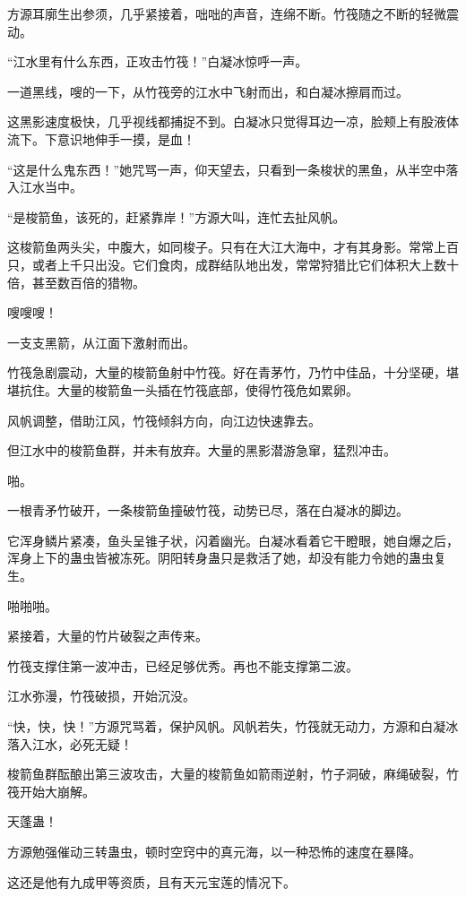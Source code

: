 \begin{this_body}
方源耳廓生出参须，几乎紧接着，咄咄的声音，连绵不断。竹筏随之不断的轻微震动。

“江水里有什么东西，正攻击竹筏！”白凝冰惊呼一声。

一道黑线，嗖的一下，从竹筏旁的江水中飞射而出，和白凝冰擦肩而过。

这黑影速度极快，几乎视线都捕捉不到。白凝冰只觉得耳边一凉，脸颊上有股液体流下。下意识地伸手一摸，是血！

“这是什么鬼东西！”她咒骂一声，仰天望去，只看到一条梭状的黑鱼，从半空中落入江水当中。

“是梭箭鱼，该死的，赶紧靠岸！”方源大叫，连忙去扯风帆。

这梭箭鱼两头尖，中腹大，如同梭子。只有在大江大海中，才有其身影。常常上百只，或者上千只出没。它们食肉，成群结队地出发，常常狩猎比它们体积大上数十倍，甚至数百倍的猎物。

嗖嗖嗖！

一支支黑箭，从江面下激射而出。

竹筏急剧震动，大量的梭箭鱼射中竹筏。好在青茅竹，乃竹中佳品，十分坚硬，堪堪抗住。大量的梭箭鱼一头插在竹筏底部，使得竹筏危如累卵。

风帆调整，借助江风，竹筏倾斜方向，向江边快速靠去。

但江水中的梭箭鱼群，并未有放弃。大量的黑影潜游急窜，猛烈冲击。

啪。

一根青矛竹破开，一条梭箭鱼撞破竹筏，动势已尽，落在白凝冰的脚边。

它浑身鳞片紧凑，鱼头呈锥子状，闪着幽光。白凝冰看着它干瞪眼，她自爆之后，浑身上下的蛊虫皆被冻死。阴阳转身蛊只是救活了她，却没有能力令她的蛊虫复生。

啪啪啪。

紧接着，大量的竹片破裂之声传来。

竹筏支撑住第一波冲击，已经足够优秀。再也不能支撑第二波。

江水弥漫，竹筏破损，开始沉没。

“快，快，快！”方源咒骂着，保护风帆。风帆若失，竹筏就无动力，方源和白凝冰落入江水，必死无疑！

梭箭鱼群酝酿出第三波攻击，大量的梭箭鱼如箭雨逆射，竹子洞破，麻绳破裂，竹筏开始大崩解。

天蓬蛊！

方源勉强催动三转蛊虫，顿时空窍中的真元海，以一种恐怖的速度在暴降。

这还是他有九成甲等资质，且有天元宝莲的情况下。


\end{this_body}
